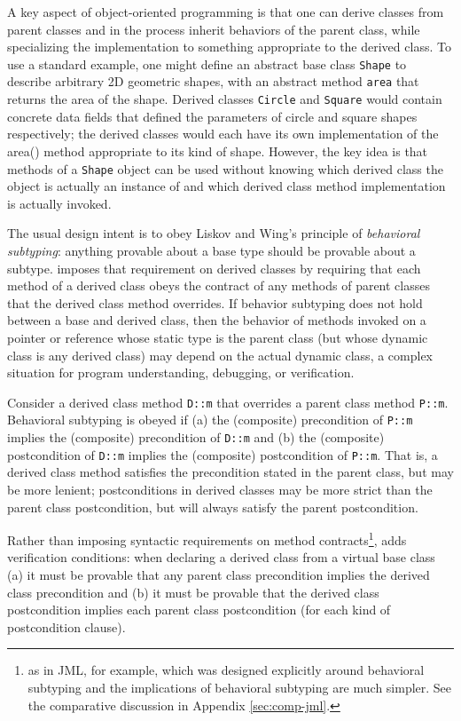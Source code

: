 A key aspect of object-oriented programming is 
that one can derive classes from parent classes and in 
the process inherit behaviors of the parent class, 
while specializing the implementation to something appropriate to the derived class. 
To use a standard example, 
one might define an abstract base class \lstinline|Shape| to describe arbitrary 2D geometric shapes, 
with an abstract method 
\lstinline|area| that returns the area of the shape. 
Derived classes \lstinline|Circle| and \lstinline|Square| would contain concrete data fields that defined the parameters of circle and square shapes respectively; 
the derived classes would each have its own implementation of the area() method appropriate to its kind of shape. 
However, the key idea is that methods of a \lstinline|Shape| object can be used without knowing which derived class the object is actually an instance of and
which derived class method implementation is actually invoked.

The usual design intent is to obey Liskov and Wing's principle of \textit{behavioral subtyping}\cite{Liskov:1994:BNS:197320.197383}: 
anything provable about a base type should be provable about a subtype.
\NAME imposes that requirement on derived classes by 
requiring that each method of a derived class obeys the contract of any methods of parent classes that the derived class method overrides. 
If behavior subtyping does not hold between a base and derived class, then the behavior of methods
invoked on a pointer or reference whose static type is the
parent class (but whose dynamic class is any derived class) may depend on the actual dynamic class, 
a complex situation for program understanding, debugging, or verification.

Consider a derived class method \lstinline|D::m| that overrides a parent class method \lstinline|P::m|.
Behavioral subtyping is obeyed if (a) the (composite) precondition of
\lstinline|P::m| implies the (composite) precondition of 
\lstinline|D::m| and (b) the (composite) postcondition of
\lstinline|D::m| implies the (composite) postcondition of 
\lstinline|P::m|. That is, a derived class method satisfies the precondition stated in the parent class, but may be more lenient; 
postconditions in derived classes may be more strict than the parent class postcondition, but will always 
satisfy the parent postcondition. 

Rather than imposing syntactic requirements on method contracts\footnote{as in JML, for example, which was designed explicitly around behavioral subtyping and the implications of behavioral subtyping are much simpler. 
	See the comparative discussion in Appendix \ref{sec:comp-jml}.},
\NAME adds verification conditions: when declaring a derived class from a virtual base class (a) it must be provable that any parent class precondition implies the derived class precondition and (b) it must be provable that the derived class postcondition implies each parent class postcondition (for each kind of postcondition clause). 

